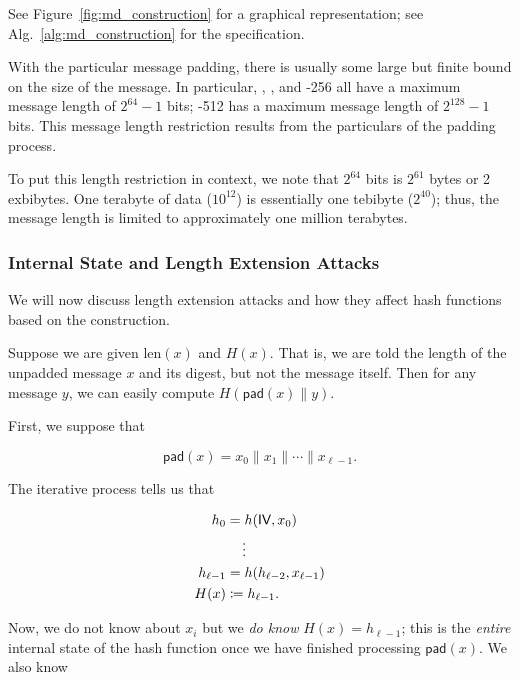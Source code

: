 \noindent
See Figure~\ref{fig:md_construction} for a graphical representation;
see Alg.~\ref{alg:md_construction} for the specification.




With the particular message padding, there is usually some large
but finite bound on the size of the message.
In particular, \MDFive{}, \ShaOne{}, and \ShaTwo{}-256 
all have a maximum message length of $2^{64}-1$ bits;
\ShaTwo{}-512 has a maximum message length of $2^{128}-1$ bits.
This message length restriction results from the particulars
of the padding process.

To put this length restriction in context,
we note that $2^{64}$ bits is $2^{61}$ bytes or 2 exbibytes.
One terabyte of data ($10^{12}$) is essentially one tebibyte ($2^{40}$);
thus, the message length is limited to approximately
one million terabytes.

\subsubsection{Internal State and Length Extension Attacks}

We will now discuss length extension attacks and how they affect
\glspl{hash function} based on the \MD{} construction.

Suppose we are given $\text{len}(x)$ and $H(x)$.
That is, we are told the length of the unpadded message $x$ and its digest,
but not the message itself.
Then for any message $y$, we can easily compute $H(\textsf{pad}(x)\|y)$.

First, we suppose that

\begin{equation}
    \textsf{pad}(x) = x_{0}\|x_{1}\|\cdots\|x_{\ell-1}.
\end{equation}

\noindent
The iterative process tells us that

\begin{align}
    h_{0} &= h(\textsf{IV}, x_{0}) \nonumber\\
        &\quad \vdots \nonumber\\
    h_{\ell-1} &= h(h_{\ell-2}, x_{\ell-1}) \nonumber\\
    H(x) &\coloneqq{} h_{\ell-1}.
\end{align}

\noindent
Now, we do not know about $x_{i}$ but we \emph{do know} $H(x) = h_{\ell-1}$;
this is the \emph{entire} internal state of the \gls{hash function} once we
have finished processing $\textsf{pad}(x)$.
We also know


